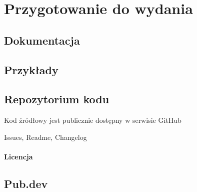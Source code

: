 \section{Przygotowanie do wydania}

\subsection{Dokumentacja}
\subsection{Przykłady}
\subsection{Repozytorium kodu}
Kod źródłowy jest publicznie dostępny w serwisie GitHub \cite{RoundSpot_GitHub}

Issues, Readme, Changelog

\paragraph{Licencja}

\subsection{Pub.dev}
